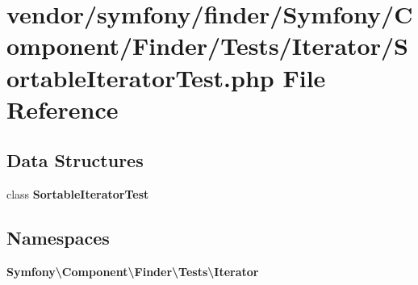 \section{vendor/symfony/finder/\+Symfony/\+Component/\+Finder/\+Tests/\+Iterator/\+Sortable\+Iterator\+Test.php File Reference}
\label{_sortable_iterator_test_8php}
\subsection*{Data Structures}
\begin{DoxyCompactItemize}
\item 
class {\bf Sortable\+Iterator\+Test}
\end{DoxyCompactItemize}
\subsection*{Namespaces}
\begin{DoxyCompactItemize}
\item 
 {\bf Symfony\textbackslash{}\+Component\textbackslash{}\+Finder\textbackslash{}\+Tests\textbackslash{}\+Iterator}
\end{DoxyCompactItemize}
